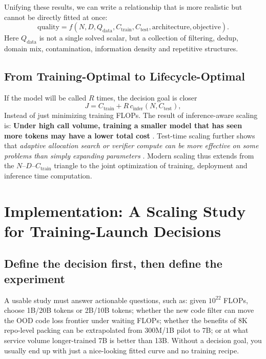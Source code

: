 \documentclass[UTF8,10pt,a4paper,fontset=none]{ctexart}
\begin{document}
Unifying these results, we can write a relationship that is more realistic but cannot be directly fitted at once:
\begin{equation}
 \mathrm{quality}=f\!\left(N,D,Q_{\mathrm{data}},C_{\mathrm{train}},
 C_{\mathrm{test}},\mathrm{architecture},\mathrm{objective}\right).
 \label{en:eq:modern-scaling}
\end{equation}
Here $Q_{\mathrm{data}}$ is not a single solved scalar, but a collection of filtering, dedup, domain mix, contamination, information density and repetitive structures.

\subsection{From Training-Optimal to Lifecycle-Optimal}

If the model will be called $R$ times, the decision goal is closer
\begin{equation}
  J=C_{\mathrm{train}}+R\,c_{\mathrm{infer}}(N,C_{\mathrm{test}}),
  \label{en:eq:lifecycle}
\end{equation}
Instead of just minimizing training FLOPs. The result of inference-aware scaling is: \textbf{ Under high call volume, training a smaller model that has seen more tokens may have a lower total cost }\cite{en:sardana2024}. Test-time scaling further shows that \textit{ adaptive allocation search or verifier compute can be more effective on some problems than simply expanding parameters }\cite{en:snell2024}. Modern scaling thus extends from the $N$--$D$--$C_{\mathrm{train}}$ triangle to the joint optimization of training, deployment and inference time computation.

\section{Implementation: A Scaling Study for Training-Launch Decisions}

\subsection{Define the decision first, then define the experiment}

A usable study must answer actionable questions, such as: given $10^{22}$ FLOPs, choose 1B/20B tokens or 2B/10B tokens; whether the new code filter can move the OOD code loss frontier under waiting FLOPs; whether the benefits of 8K repo-level packing can be extrapolated from 300M/1B pilot to 7B; or at what service volume longer-trained 7B is better than 13B. Without a decision goal, you usually end up with just a nice-looking fitted curve and no training recipe.
\end{document}
